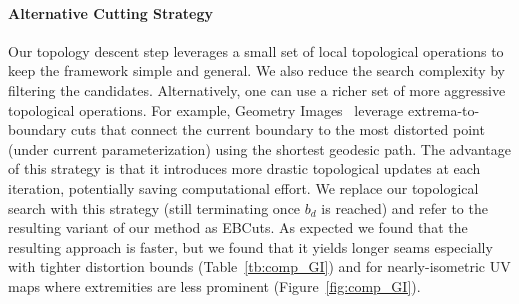 \paragraph{Alternative Cutting Strategy}
Our topology descent step leverages a small set of local topological operations to keep the framework simple and general. We also reduce the search complexity by filtering the candidates. Alternatively, one can use a richer set of more aggressive topological operations. For example, Geometry Images~\cite{Gu2002Geometry} leverage extrema-to-boundary cuts that connect the current boundary to the most distorted point (under current parameterization) using the shortest geodesic path. The advantage of this strategy is that it introduces more drastic topological updates at each iteration, potentially saving computational effort. We replace our topological search with this strategy (still terminating once $b_d$ is reached) and refer to the resulting variant of our method as EBCuts. As expected we found that the resulting approach is faster, but we found that it yields longer seams especially with tighter distortion bounds (Table~\ref{tb:comp_GI}) and for nearly-isometric UV maps where extremities are less prominent (Figure~\ref{fig:comp_GI}).





